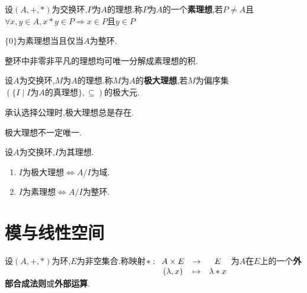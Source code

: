 \begin{deff}
    设$(A, +, *)$为交换环,$P$为$A$的理想.称$P$为$A$的一个\textbf{素理想},若$P \neq A$且$\forall x, y \in A, x * y \in P \Rightarrow x \in P \text{且} y \in P$
\end{deff}

\begin{prop}
    $\{ 0 \}$为素理想当且仅当$A$为整环.
\end{prop}

\begin{thm}[Dedekind]
    整环中非零非平凡的理想均可唯一分解成素理想的积.
\end{thm}

\begin{deff}
    设$A$为交换环,$M$为$A$的理想.称$M$为$A$的\textbf{极大理想},若$M$为偏序集$(\{ I \mid I \text{为} A \text{的真理想} \}, \subseteq)$的极大元.
\end{deff}

\begin{thm}
    承认选择公理时,极大理想总是存在.
\end{thm}

\begin{rqq}
    极大理想不一定唯一.
\end{rqq}

\begin{prop}
    设$A$为交换环,$I$为其理想.
    \begin{enumerate}
        \item $I$为极大理想$\iff A / I$为域.
        \item $I$为素理想$\iff A / I$为整环.
    \end{enumerate}
\end{prop}

\section{模与线性空间}

\begin{deff}
    设$(A, +, *)$为环,$E$为非空集合.称映射$*: \begin{array}[t]{ccc} A \times E & \to & E \\ (\lambda, x) & \mapsto & \lambda * x \end{array}$为$A$在$E$上的一个\textbf{外部合成法则}或\textbf{外部运算}.
\end{deff}

